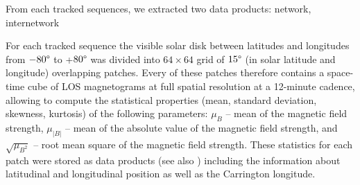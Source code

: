 \documentclass{aa}
\begin{document}
From each tracked sequences, we extracted two data products:
network,  internetwork

For each tracked sequence the visible solar disk between latitudes and longitudes from $-80\degree$ to +$80\degree$ was divided into $64\times 64$ grid of $15\degree$ (in solar latitude and longitude) overlapping patches. Every of these patches therefore contains a space-time cube of LOS magnetograms at full spatial resolution at a 12-minute cadence, allowing to compute the statistical properties (mean, standard deviation, skewness, kurtosis) of the following parameters: $\mu_B$ -- mean of the magnetic field strength, $\mu_{|B|}$ -- mean of the absolute value of the magnetic field strength, and $\sqrt{\mu_{B^2}}$ -- root mean square of the magnetic field strength.
These statistics for each patch were stored as data products (see also ) including the information about latitudinal and longitudinal position as well as the Carrington longitude.
 
\end{document}
